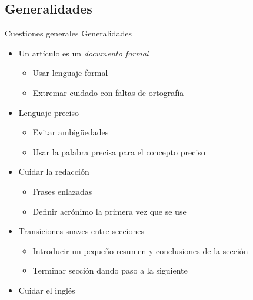 \documentclass{beamer}
\begin{document}
\subsection{Generalidades}
\begin{frame}{Cuestiones generales} {Generalidades}
	\begin{itemize}
		\item Un artículo es un \textit{documento formal}
			\begin{itemize}
			\item Usar lenguaje formal
			\item Extremar cuidado con faltas de ortografía
			\end{itemize}
		\item Lenguaje preciso
			\begin{itemize}
			\item Evitar ambigüedades
			\item Usar la palabra precisa para el concepto preciso
			\end{itemize}
		\item Cuidar la redacción
			\begin{itemize}
			\item Frases enlazadas
			\item Definir acrónimo la primera vez que se use
			\end{itemize}
		\item Transiciones suaves entre secciones
			\begin{itemize}
			\item Introducir un pequeño resumen y conclusiones de la sección
			\item Terminar sección dando paso a la siguiente
			\end{itemize}
		\item \alert{Cuidar el inglés}
	\end{itemize}
\end{frame}
\end{document}
